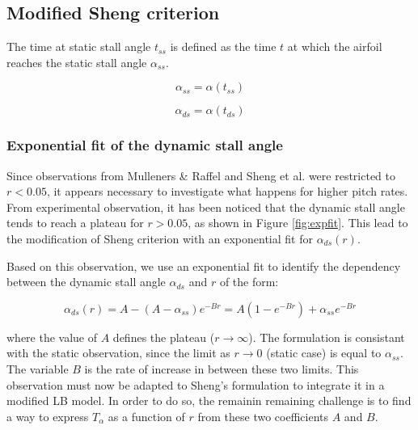 \subsection{Modified Sheng criterion}
\label{section:expfit}


The time at static stall angle $t_{ss}$ is defined as the time $t$ at which the airfoil reaches the static stall angle $\alpha_{ss}$.

\begin{equation}
\alpha_{ss} = \alpha(t_{ss})
\end{equation}

\begin{equation}
	\alpha_{ds} = \alpha(t_{ds})
\end{equation}

\subsubsection{Exponential fit of the dynamic stall angle}

Since observations from Mulleners \& Raffel \cite{mulleners_onset_2010,mulleners_onset_2012,mulleners_dynamic_2013} and Sheng et al. \cite{sheng_new_2006,sheng_modified_2008} were restricted to $r<0.05$, it appears necessary to investigate what happens for higher pitch rates. From experimental observation, it has been noticed that the dynamic stall angle tends to reach a plateau for $r>0.05$, as shown in Figure  \ref{fig:expfit}. This lead to the modification of Sheng criterion with an exponential fit for $\alpha_{ds}(r)$.

Based on this observation, we use an exponential fit to identify the dependency between the dynamic stall angle $\alpha_{ds}$ and $r$ of the form: 

\begin{equation}
\alpha_{ds}(r) = A-(A-\alpha_{ss})e^{-Br} = A(1-e^{-Br})+\alpha_{ss}e^{-Br}
\label{eq:alpha_ds_r}
\end{equation}

\noindent where the value of $A$ defines the plateau ($r \rightarrow \infty$). The formulation is consistant with the static observation, since the limit as $r \rightarrow 0$ (static case) is equal to $\alpha_{ss}$. The variable $B$ is the rate of increase in between these two limits. This observation must now be adapted to Sheng's formulation to integrate it in a modified LB model. In order to do so, the remainin remaining challenge is to find a way to express $T_\alpha$ as a function of $r$ from these two coefficients $A$ and $B$.

